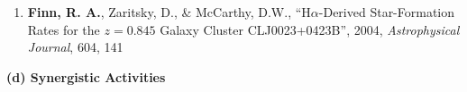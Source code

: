 \documentclass[11pt]{article}
\begin{document}
\begin{flushleft}
\begin{enumerate}{\setlength{\leftmargin}{0in}}
\item {\bf Finn, R. A.}, Zaritsky, D., \& McCarthy, D.W.,
``H$\alpha$-Derived Star-Formation Rates for the $z=0.845$ Galaxy Cluster CLJ0023+0423B'', 2004, {\it Astrophysical Journal}, 604, 141
\vspace{-.2cm}
\end{enumerate}
\vspace{-.2cm}


\medskip
{\bf (d) Synergistic Activities} \\
\medskip
\vspace{-.3cm}




\end{flushleft}
\end{document}
